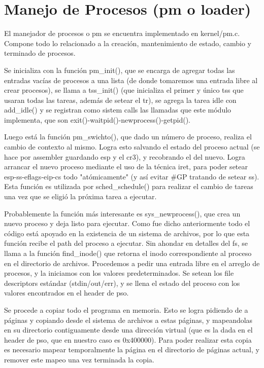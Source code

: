 \section{Manejo de Procesos (pm o loader)}

El manejador de procesos o pm se encuentra implementado en kernel/pm.c. Compone
todo lo relacionado a la creación, mantenimiento de estado, cambio y terminado
de procesos.

Se inicializa con la función pm\_init(), que se encarga de agregar todas las
entradas vacías de procesos a una lista (de donde tomaremos una entrada libre
al crear procesos), se llama a tss\_init() (que inicializa el primer y único
tss que usaran todas las tareas, además de setear el tr), se agrega la tarea
idle con add\_idle() y se registran como sistem calls las llamadas que este
módulo implementa, que son exit()-waitpid()-newprocess()-getpid().

Luego está la función pm\_swichto(), que dado un número de proceso, realiza el
cambio de contexto al mismo. Logra esto salvando el estado del proceso actual
(se hace por assembler guardando esp y el cr3), y recobrando el del nuevo.
Logra arrancar el nuevo proceso mediante el uso de la técnica iret, para poder
setear esp-ss-eflags-eip-cs todo "atómicamente" (y así evitar #GP tratando de setear
ss). Esta función es utilizada por sched\_schedule() para realizar el cambio de
tareas una vez que se eligió la próxima tarea a ejecutar.

Probablemente la función más interesante es sys\_newprocess(), que crea un
nuevo proceso y deja listo para ejecutar. Como fue dicho anteriormente todo el
código está apoyado en la existencia de un sistema de archivos, por lo que esta
función recibe el path del proceso a ejecutar. Sin ahondar en detalles del fs,
se llama a la función find\_inode() que retorna el inodo correspondiente al
proceso en el directorio de archivos. Procedemos a pedir una entrada libre en
el arreglo de procesos, y la iniciamos con los valores predeterminados. Se
setean los file descriptors estándar (stdin/out/err), y se llena el estado del
proceso con los valores encontrados en el header de pso.

Se procede a copiar todo el programa en memoria. Esto se logra pidiendo de a
páginas y copiando desde el sistema de archivos a estas páginas, y mapeandolas
en su directorio contiguamente desde una dirección virtual (que es la dada en
el header de pso, que en nuestro caso es 0x400000). Para poder realizar esta
copia es necesario mapear temporalmente la página en el directorio de páginas
actual, y remover este mapeo una vez terminada la copia.

